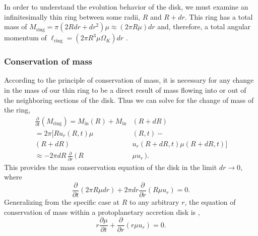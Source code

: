 \documentclass[aps,pra, twocolumn]{revtex4-1}
\begin{document}
In order to understand the evolution behavior of the disk, we must examine an infinitesimally thin ring between some radii, $R$ and $R + dr$.  This ring has a total mass of $M_\text{ring} = \pi \left(2 R dr + dr^2 \right)\mu \approx (2 \pi R \mu) dr$ and, therefore, a total angular momentum of $\ell_\text{ring} = (2\pi R^3 \mu \Omega_K)dr$ \cite{king2002}.


\subsubsection{\label{section 2.1.1} Conservation of mass}
According to the principle of conservation of mass, it is necessary for any change in the mass of our thin ring to be a direct result of mass flowing into or out of the neighboring sections of the disk.  Thus we can solve for the change of mass of the ring,
\begin{equation}
\begin{split}
\frac{\partial}{\partial t}\left(  M_\text{ring}\right)= M_{\text{in}}(R) + M_{\text{in}}&(R + dR)  \\
= 2\pi [ R u_r(R, t) \mu&(R, t) -   \\
(R + dR)& u_r(R+dR, t) \mu(R+dR, t)] \\
 \approx -2\pi dR \,\frac{\partial}{\partial r}\,(\,R&\mu u_r\,).
\nonumber
\end{split}
\end{equation}
This provides the mass conservation equation of the disk in the limit $dr \rightarrow 0$, where
\begin{equation}
\frac{\partial}{\partial t}\left(  2\pi R  \mu dr \right) + 2\pi dr \frac{\partial}{\partial r}(R \mu u_r) = 0. \nonumber
\end{equation}
Generalizing from the specific case at $R$ to any arbitrary $r$, the equation of conservation of mass within a protoplanetary accretion disk is \cite{king2002},
\begin{equation}
r \frac{\partial \mu}{\partial t} + \frac{\partial}{\partial r}(r \mu u_r) = 0. \label{consMass}
\end{equation}
\end{document}
